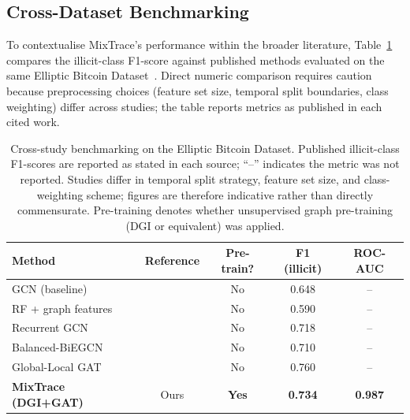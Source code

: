 \documentclass[12pt,a4paper]{article}
\begin{document}
\subsection{Cross-Dataset Benchmarking}
\label{sec:crossdataset}

To contextualise MixTrace's performance within the broader
literature, Table~\ref{tab:benchmark} compares the illicit-class
F1-score against published methods evaluated on the same Elliptic
Bitcoin Dataset~\citep{weber2019}.
Direct numeric comparison requires caution because preprocessing
choices (feature set size, temporal split boundaries, class
weighting) differ across studies; the table reports metrics as
published in each cited work.

\begin{table}[htbp]
  \caption{Cross-study benchmarking on the Elliptic Bitcoin
    Dataset. Published illicit-class F1-scores are reported
    as stated in each source; ``--'' indicates the metric was
    not reported. Studies differ in temporal split strategy,
    feature set size, and class-weighting scheme; figures
    are therefore indicative rather than directly
    commensurate. Pre-training denotes whether unsupervised
    graph pre-training (DGI or equivalent) was applied.}
  \label{tab:benchmark}
  \centering
  \small
  \setlength{\tabcolsep}{5pt}
  \begin{tabular}{lcccc}
    \toprule
    \textbf{Method} & \textbf{Reference}
      & \textbf{Pre-train?}
      & \textbf{F1 (illicit)}
      & \textbf{ROC-AUC} \\
    \midrule
    GCN (baseline)
      & \citet{weber2019} & No  & 0.648 & -- \\
    RF + graph features
      & \citet{weber2019} & No  & 0.590 & -- \\
    Recurrent GCN
      & \citet{alarab2024} & No  & 0.718 & -- \\
    Balanced-BiEGCN
      & \citet{xiao2025} & No  & 0.710 & -- \\
    Global-Local GAT
      & \citet{globalloc2025} & No  & 0.760 & -- \\
    \midrule
    \textbf{MixTrace (DGI+GAT)}
      & Ours & \textbf{Yes} & \textbf{0.734} & \textbf{0.987} \\
    \bottomrule
  \end{tabular}
\end{table}
\end{document}
